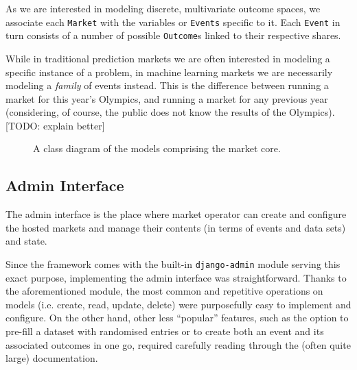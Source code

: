 \documentclass[bsc,frontabs,twoside,singlespacing,parskip,deptreport]{infthesis}     %
\begin{document}
    As we are interested in modeling discrete, multivariate outcome spaces, we associate each {\tt Market} with the variables or {\tt Events} specific to it. Each {\tt Event} in turn consists of a number of possible {\tt Outcome}s linked to their respective shares. 

    While in traditional prediction markets we are often interested in modeling a specific instance of a problem, in machine learning markets we are necessarily modeling a {\em family} of events instead. This is the difference between running a market for this year’s Olympics, and running a market for any previous year (considering, of course, the public does not know the results of the Olympics). [TODO: explain better]


\begin{figure}
\noindent{}
\label{fig:class_diagram}
\caption{A class diagram of the models comprising the market core. }
\end{figure}


\subsection{Admin Interface}
    The admin interface is the place where market operator can create and configure the hosted markets and manage their contents (in terms of events and data sets) and state.

    Since the framework comes with the built-in {\tt django-admin} module serving this exact purpose, implementing the admin interface was straightforward. Thanks to the aforementioned module, the most common and repetitive operations on models (i.e. create, read, update, delete) were purposefully easy to implement and configure. On the other hand, other less ``popular'' features, such as the option to pre-fill a dataset with randomised entries or to create both an event and its associated outcomes in one go, required carefully reading through the (often quite large) documentation.   
\end{document}
